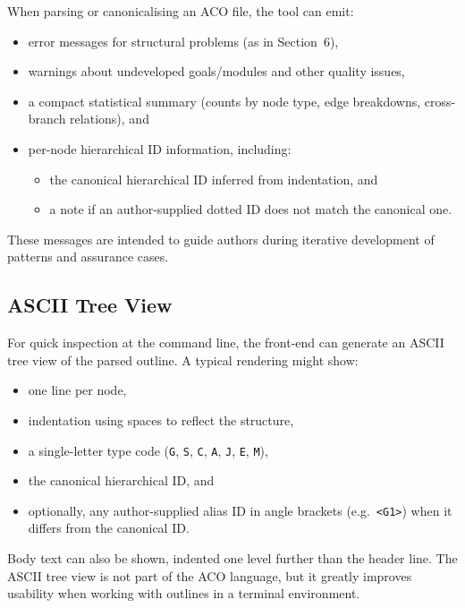 \documentclass[11pt]{article}
\begin{document}
When parsing or canonicalising an ACO file, the tool can emit:
\begin{itemize}[leftmargin=2em]
  \item error messages for structural problems (as in Section~6),
  \item warnings about undeveloped goals/modules and other quality issues,
  \item a compact statistical summary (counts by node type, edge breakdowns, cross-branch relations), and
  \item per-node hierarchical ID information, including:
    \begin{itemize}[leftmargin=1.5em]
      \item the canonical hierarchical ID inferred from indentation, and
      \item a note if an author-supplied dotted ID does not match the canonical one.
    \end{itemize}
\end{itemize}

These messages are intended to guide authors during iterative development of patterns and assurance cases.

\subsection*{ASCII Tree View}

For quick inspection at the command line, the front-end can generate an ASCII tree view of the parsed outline. A typical rendering might show:

\begin{itemize}[leftmargin=2em]
  \item one line per node,
  \item indentation using spaces to reflect the structure,
  \item a single-letter type code (\texttt{G}, \texttt{S}, \texttt{C}, \texttt{A}, \texttt{J}, \texttt{E}, \texttt{M}),
  \item the canonical hierarchical ID, and
  \item optionally, any author-supplied alias ID in angle brackets (e.g.\ \texttt{<G1>}) when it differs from the canonical ID.
\end{itemize}

Body text can also be shown, indented one level further than the header line. The ASCII tree view is not part of the ACO language, but it greatly improves usability when working with outlines in a terminal environment.
\end{document}
